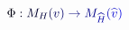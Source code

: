 \documentclass[12pt]{article}
\begin{document}
\makeatletter
\renewcommand*{\@textcolor}[3]{%
  \protect\leavevmode
  \begingroup
    \color#1{#2}#3%
  \endgroup
}
\makeatother
\begin{displaymath}
\mathcolor[RGB]{0,0,15}{\Phi} \mathcolor[RGB]{0,0,30}{:} \mathcolor[RGB]{0,0,45}{M} _ { \mathcolor[RGB]{0,0,60}{H} } \mathcolor[RGB]{0,0,75}{(} \mathcolor[RGB]{0,0,90}{v} \mathcolor[RGB]{0,0,105}{)} \mathcolor[RGB]{0,0,120}{\to} \mathcolor[RGB]{0,0,135}{M} _ { \mathcolor[RGB]{0,0,150}{\widehat { \mathcolor[RGB]{0,0,165}{H} } } } \mathcolor[RGB]{0,0,180}{(} \mathcolor[RGB]{0,0,195}{\widehat { \mathcolor[RGB]{0,0,210}{v} } } \mathcolor[RGB]{0,0,225}{)}
\end{displaymath}
\end{document}
